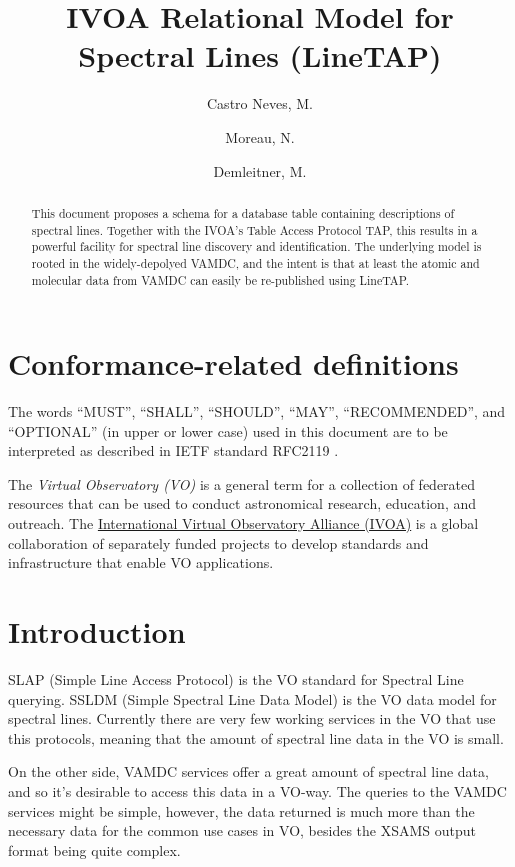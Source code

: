 \documentclass[11pt,a4paper]{ivoa}
\title{IVOA Relational Model for Spectral Lines (LineTAP)}
\author{Castro Neves, M.}
\author{Moreau, N.}
\author{Demleitner, M.}
\begin{document}
\begin{abstract}

This document proposes a schema for a database table containing
descriptions of spectral lines.  Together with the IVOA's Table Access
Protocol TAP, this results in a powerful facility for spectral line
discovery and identification.  The underlying model is rooted in the
widely-depolyed VAMDC, and the intent is that at least the atomic and
molecular data from VAMDC can easily be re-published using LineTAP.

\end{abstract}




\section*{Conformance-related definitions}

The words ``MUST'', ``SHALL'', ``SHOULD'', ``MAY'', ``RECOMMENDED'', and
``OPTIONAL'' (in upper or lower case) used in this document are to be
interpreted as described in IETF standard RFC2119 \citep{std:RFC2119}.

The \emph{Virtual Observatory (VO)} is a
general term for a collection of federated resources that can be used
to conduct astronomical research, education, and outreach.
The \href{http://www.ivoa.net}{International
Virtual Observatory Alliance (IVOA)} is a global
collaboration of separately funded projects to develop standards and
infrastructure that enable VO applications.


\section{Introduction}

SLAP (Simple Line Access Protocol)\citep{2010ivoa.specQ1209O} is the VO
standard for Spectral Line querying. SSLDM (Simple Spectral Line Data
Model)\citep{2010ivoa.spec.1209O} is the VO data model for spectral
lines.
Currently there are very few working services in the VO that use this protocols, meaning that the amount of spectral line data in the VO is small. 

On the other side, VAMDC services offer a great amount of spectral line
data, and  so it's desirable to access this data in a VO-way. 
The queries to the VAMDC services might be simple, however, the data returned is much more than the necessary data for the common use cases in VO, besides the XSAMS \citep{XSAMS:Docs} output format being quite complex.
\end{document}
